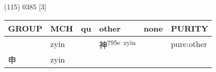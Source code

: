 \documentclass[14pt,a4paper]{scrartcl}
\begin{document}
(115) 0385 {[}3{]}

\begin{longtable}[c]{@{}llllll@{}}
\toprule
\begin{minipage}[b]{0.14\columnwidth}\raggedright\strut
GROUP
\strut\end{minipage} &
\begin{minipage}[b]{0.14\columnwidth}\raggedright\strut
MCH
\strut\end{minipage} &
\begin{minipage}[b]{0.14\columnwidth}\raggedright\strut
qu
\strut\end{minipage} &
\begin{minipage}[b]{0.14\columnwidth}\raggedright\strut
other
\strut\end{minipage} &
\begin{minipage}[b]{0.14\columnwidth}\raggedright\strut
none
\strut\end{minipage} &
\begin{minipage}[b]{0.14\columnwidth}\raggedright\strut
PURITY
\strut\end{minipage}\tabularnewline
\midrule
\endhead
\begin{minipage}[t]{0.14\columnwidth}\raggedright\strut
𢑚
\strut\end{minipage} &
\begin{minipage}[t]{0.14\columnwidth}\raggedright\strut
zyin
\strut\end{minipage} &
\begin{minipage}[t]{0.14\columnwidth}\raggedright\strut
\strut\end{minipage} &
\begin{minipage}[t]{0.14\columnwidth}\raggedright\strut
神\textsuperscript{795e~zyin}
\strut\end{minipage} &
\begin{minipage}[t]{0.14\columnwidth}\raggedright\strut
\strut\end{minipage} &
\begin{minipage}[t]{0.14\columnwidth}\raggedright\strut
pure:other
\strut\end{minipage}\tabularnewline
\begin{minipage}[t]{0.14\columnwidth}\raggedright\strut
申
\strut\end{minipage} &
\begin{minipage}[t]{0.14\columnwidth}\raggedright\strut
zyin
\strut\end{minipage} &
\begin{minipage}[t]{0.14\columnwidth}\raggedright\strut
\strut\end{minipage} &

\end{longtable}
\end{document}
